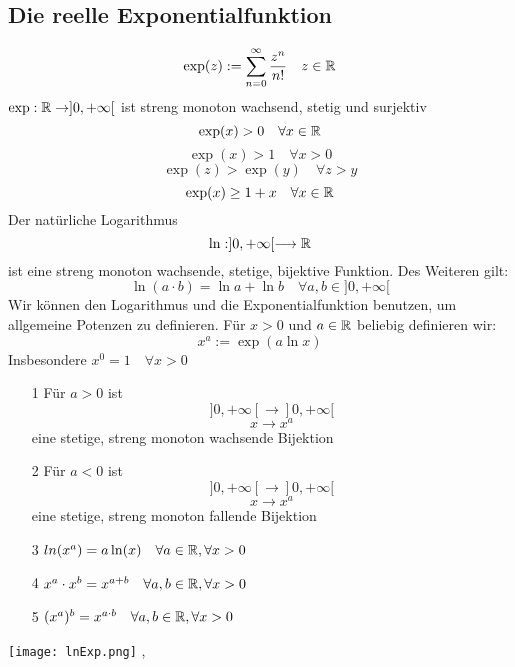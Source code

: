 \subsection{Die reelle Exponentialfunktion}
\Def[Exponentialfunktion] \[ \exp(z) := \sum_{n=0}^{\infty} \frac{z^n}{n!} \quad z \in \mathbb{R}\]
\Satz[3.24] \(\exp: \mathbb{R} \rightarrow ]0,+\infty[\) ist streng monoton wachsend, stetig und surjektiv \newline
\Korollar[3.25] \[ \exp(x) > 0 \quad \forall x \in \mathbb{R} \]
\[\exp(x) > 1 \quad \forall x > 0\] \newline
\Korollar[3.26] \[\exp(z) > \exp(y) \quad \forall z > y\]
\Korollar[3.27] \[\exp(x) \geq 1 + x \quad \forall x \in \mathbb{R}\]
\Korollar[3.28] Der natürliche Logarithmus
\[\ln : ]0,+\infty[ \longrightarrow \mathbb{R} \] ist eine streng monoton wachsende, stetige, bijektive Funktion. Des Weiteren gilt:
\[\ln(a \cdot b) = \ln a + \ln b \quad \forall a,b \in ]0,+\infty[\]
Wir können den Logarithmus und die Exponentialfunktion benutzen, um allgemeine Potenzen zu definieren. Für \(x > 0\) und \( a \in \mathbb{R} \) beliebig definieren wir:
\[ x^a := \exp( a \ln x)\]
Insbesondere \( x^0 = 1 \quad \forall x > 0\) \newline
\Korollar[3.29]
\begin{enumerate}
    \item [1] Für \(a > 0\) ist \[]0,+\infty[ \longrightarrow ]0,+\infty[\]
    \[x \longrightarrow x^a\] eine stetige, streng monoton wachsende Bijektion \newline
    \item [2] Für \(a < 0\) ist \[]0,+\infty[ \longrightarrow ]0,+\infty[\]
    \[x \longrightarrow x^a\] eine stetige, streng monoton fallende Bijektion
    \item [3] \(ln(x^a) = a \ln(x) \quad \forall a \in \mathbb{R}, \forall x > 0\)
    \item [4] \(x^a \cdot x^b = x^{a+b} \quad \forall a,b \in \mathbb{R}, \forall x > 0\)
    \item [5] \((x^a)^b = x^{a \cdot b} \quad \forall a,b \in \mathbb{R}, \forall x > 0\)
\end{enumerate}
\texttt{[image: lnExp.png]}
\sep

